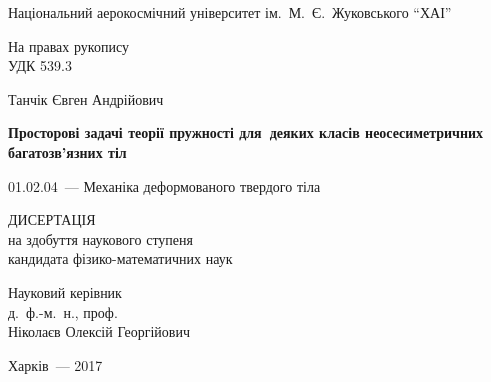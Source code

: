 \documentclass[book,14pt,small,oneside]{ncc}
\begin{document}
\indentaftersection
{}

\begin{titlepage}
\begin{center}
Національний аерокосмічний університет ім.~М.~Є.~Жуковського ``ХАІ''
\end{center}
\vskip1cm
\begin{flushright}
На правах рукопису \\
УДК 539.3
\end{flushright}
\vskip2cm
\begin{center}
\large 
Танчік Євген Андрійович
\end{center}
\vskip1cm
\begin{center}
\huge\bf 
Просторові задачі теорії пружності для~деяких класів неосесиметричних багатозв'язних тіл
\end{center}
\vskip1cm
\begin{center}
01.02.04~--- Механіка деформованого твердого тіла
\end{center}
\vskip1cm
\begin{center}
ДИСЕРТАЦІЯ \\
на здобуття наукового ступеня \\
кандидата фізико-математичних наук
\end{center}
\vskip2cm
\begin{flushright}
Науковий керівник \\
д.~ф.-м.~н., проф. \\
Ніколаєв Олексій Георгійович
\end{flushright}
\vskip2cm
\begin{center}
Харків~--- 2017
\end{center}
\end{titlepage}
\tableofcontents



%
%
%
%

\end{document}
